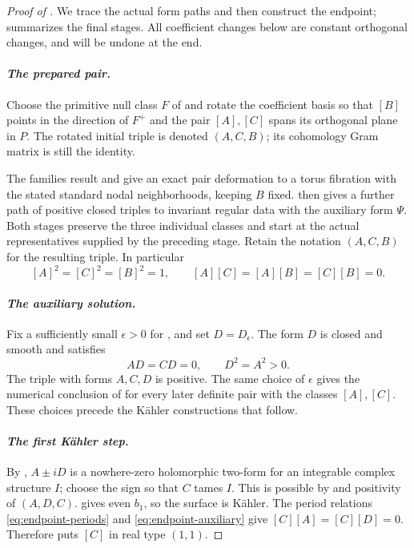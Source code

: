 \begin{proof}[Proof of ]
We trace the actual form paths and then construct the endpoint;
 summarizes the final stages.
All coefficient changes below are constant orthogonal changes, and
will be undone at the end.

\paragraph{\emph{The prepared pair.}}
Choose the primitive null class $F$ of  and
rotate the coefficient basis so that $[B]$ points in the direction of
$F^+$ and the pair $[A],[C]$ spans its orthogonal plane in $P$.
The rotated initial triple is denoted $(A,C,B)$; its cohomology Gram
matrix is still the identity.

The families result and  give an
exact pair deformation to a torus fibration with the stated standard
nodal neighborhoods, keeping $B$ fixed.
 then gives a further path of positive
closed triples to invariant regular data with the auxiliary form
$\Psi$.  Both stages preserve the three individual classes and start
at the actual representatives supplied by the preceding stage.
Retain the notation
$(A,C,B)$ for the resulting triple. In particular
\begin{equation}\label{eq:endpoint-periods}
 [A]^2=[C]^2=[B]^2=1,\qquad
 [A][C]=[A][B]=[C][B]=0.
\end{equation}

\paragraph{\emph{The auxiliary solution.}}
Fix a sufficiently small $\epsilon>0$ for
, and set
$D=D_\epsilon$. The form $D$ is closed and smooth and satisfies
\begin{equation}\label{eq:endpoint-auxiliary}
 AD=CD=0,\qquad D^2=A^2>0.
\end{equation}
The triple with forms $A,C,D$ is positive. The same choice of
$\epsilon$ gives the numerical conclusion of
 for every later definite pair with the
classes $[A],[C]$. These choices precede the K\"ahler constructions
that follow.

\paragraph{\emph{The first K\"ahler step.}}
By , $A\pm iD$ is a nowhere-zero
holomorphic two-form for an integrable complex structure $I$; choose the
sign so that $C$ tames $I$. This is possible by
 and positivity of $(A,D,C)$.
 gives even $b_1$, so the surface is K\"ahler.
The period relations \eqref{eq:endpoint-periods} and
\eqref{eq:endpoint-auxiliary} give
$[C][A]=[C][D]=0$. Therefore  puts
$[C]$ in real type $(1,1)$.


\end{proof}
